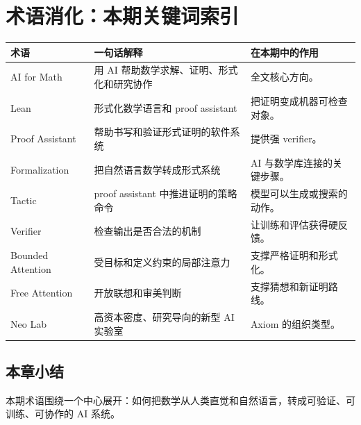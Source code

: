 \section{术语消化：本期关键词索引}

\begin{longtable}{p{}p{}p{}}
\toprule
术语 & 一句话解释 & 在本期中的作用 \\
\midrule
AI for Math & 用 AI 帮助数学求解、证明、形式化和研究协作 & 全文核心方向。 \\
Lean & 形式化数学语言和 proof assistant & 把证明变成机器可检查对象。 \\
Proof Assistant & 帮助书写和验证形式证明的软件系统 & 提供强 verifier。 \\
Formalization & 把自然语言数学转成形式系统 & AI 与数学库连接的关键步骤。 \\
Tactic & proof assistant 中推进证明的策略命令 & 模型可以生成或搜索的动作。 \\
Verifier & 检查输出是否合法的机制 & 让训练和评估获得硬反馈。 \\
Bounded Attention & 受目标和定义约束的局部注意力 & 支撑严格证明和形式化。 \\
Free Attention & 开放联想和审美判断 & 支撑猜想和新证明路线。 \\
Neo Lab & 高资本密度、研究导向的新型 AI 实验室 & Axiom 的组织类型。 \\
\bottomrule
\end{longtable}

\subsection{本章小结}

本期术语围绕一个中心展开：如何把数学从人类直觉和自然语言，转成可验证、可训练、可协作的 AI 系统。

